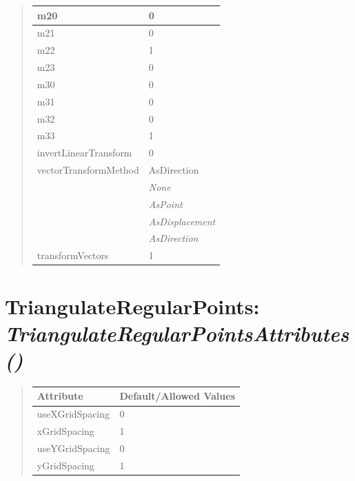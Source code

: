 \documentclass[letterpaper,10pt,english]{sphinxmanual}
\begin{document}
\begin{quote}
\begin{longtable}{|l|l|}
m20
 & 
0
\\
\hline
m21
 & 
0
\\
\hline
m22
 & 
1
\\
\hline
m23
 & 
0
\\
\hline
m30
 & 
0
\\
\hline
m31
 & 
0
\\
\hline
m32
 & 
0
\\
\hline
m33
 & 
1
\\
\hline
invertLinearTransform
 & 
0
\\
\hline
vectorTransformMethod
 & 
AsDirection
\\
\hline & 
\emph{None}
\\
\hline & 
\emph{AsPoint}
\\
\hline & 
\emph{AsDisplacement}
\\
\hline & 
\emph{AsDirection}
\\
\hline
transformVectors
 & 
1
\\
\hline\end{longtable}

\end{quote}

\begin{DUlineblock}{0em}
\item[] 
\end{DUlineblock}

\begin{DUlineblock}{0em}
\item[] 
\end{DUlineblock}


\section{\textbf{TriangulateRegularPoints}: \emph{TriangulateRegularPointsAttributes()}}
\label{attributes:triangulateregularpoints-triangulateregularpointsattributes}
\begin{DUlineblock}{0em}
\item[] 
\end{DUlineblock}
\begin{quote}

\begin{tabulary}{\linewidth}{|L|L|}
\hline

\textbf{Attribute}
 & 
\textbf{Default/Allowed Values}
\\
\hline
useXGridSpacing
 & 
0
\\
\hline
xGridSpacing
 & 
1
\\
\hline
useYGridSpacing
 & 
0
\\
\hline
yGridSpacing
 & 
1
\\
\hline\end{tabulary}

\end{quote}
\end{document}
